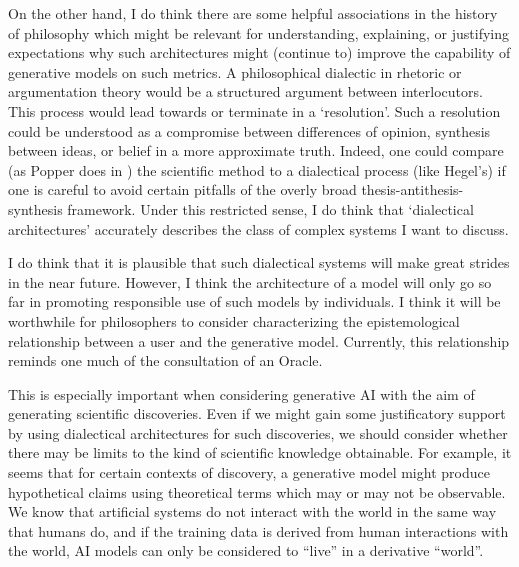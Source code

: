 \documentclass[11pt, oneside]{article}   	%
\begin{document}
On the other hand, I do think there are some helpful associations in the history of philosophy which might be relevant for understanding, explaining, or justifying expectations why such architectures might (continue to) improve the capability of generative models on such metrics.  A philosophical dialectic in rhetoric or argumentation theory would be a structured argument between interlocutors.  This process would lead towards or terminate in a `resolution'.  Such a resolution could be understood as a compromise between differences of opinion, synthesis between ideas, or belief in a more approximate truth.  Indeed, one could compare (as Popper does in \citep{PopperCR1963}) the scientific method to a dialectical process (like Hegel's) if one is careful to avoid certain pitfalls of the overly broad thesis-antithesis-synthesis framework. Under this restricted sense, I do think that `dialectical architectures' accurately describes the class of complex systems I want to discuss.

 

I do think that it is plausible that such dialectical systems will make great strides in the near future. However, I think the architecture of a model will only go so far in promoting responsible use of such models by individuals.  I think it will be worthwhile for philosophers to consider characterizing the epistemological relationship between a user and the generative model.  Currently, this relationship reminds  one much of the consultation of an Oracle.  



This is especially important when considering generative AI with the aim of generating scientific discoveries.  Even if we might gain some justificatory support by using dialectical architectures for such discoveries, we should consider whether there may be limits to the kind of scientific knowledge obtainable.  For example, it seems that for certain contexts of discovery, a generative model might produce hypothetical claims using theoretical terms which may or may not be observable.  We know that artificial systems do not interact with the world in the same way that humans do, and if the training data is derived from human interactions with the world, AI models can only be considered to ``live'' in a derivative ``world''.
\end{document}
